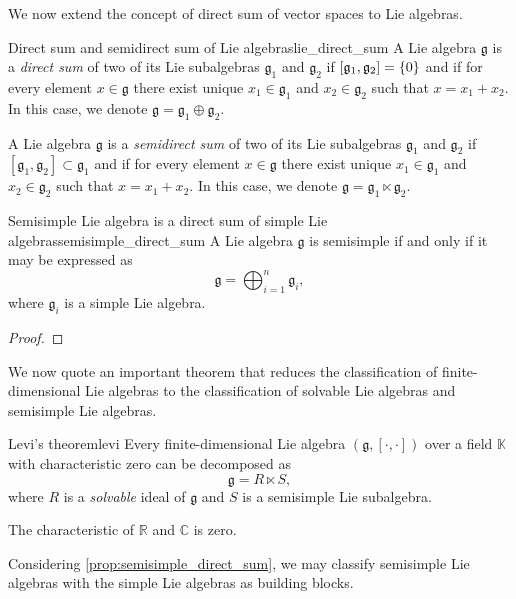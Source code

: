 We now extend the concept of direct sum of vector spaces to Lie algebras.
\begin{definition}{Direct sum and semidirect sum of Lie algebras}{lie_direct_sum}
    A Lie algebra \(\mathfrak{g}\) is a \emph{direct sum} of two of its Lie subalgebras \(\mathfrak{g}_1\) and \(\mathfrak{g}_2\) if \([\mathfrak{g}_1, \mathfrak{g}_2] = \{0\}\) and if for every element \(x \in \mathfrak{g}\) there exist unique \(x_1 \in \mathfrak{g}_1\) and \(x_2 \in \mathfrak{g}_2\) such that \(x = x_1 + x_2.\) In this case, we denote \(\mathfrak{g} = \mathfrak{g}_1 \oplus \mathfrak{g}_2.\)

    A Lie algebra \(\mathfrak{g}\) is a \emph{semidirect sum} of two of its Lie subalgebras \(\mathfrak{g}_1\) and \(\mathfrak{g}_2\) if \([\mathfrak{g}_1, \mathfrak{g}_2] \subset \mathfrak{g}_1\) and if for every element \(x \in \mathfrak{g}\) there exist unique \(x_1 \in \mathfrak{g}_1\) and \(x_2 \in \mathfrak{g}_2\) such that \(x = x_1 + x_2.\) In this case, we denote \(\mathfrak{g} = \mathfrak{g}_1 \ltimes \mathfrak{g}_2\).
\end{definition}
\begin{proposition}{Semisimple Lie algebra is a direct sum of simple Lie algebras}{semisimple_direct_sum}
    A Lie algebra \(\mathfrak{g}\) is semisimple if and only if it may be expressed as
    \begin{equation*}
        \mathfrak{g} = \bigoplus_{i = 1}^{n} \mathfrak{g}_i,
    \end{equation*}
    where \(\mathfrak{g}_i\) is a simple Lie algebra.
\end{proposition}
\begin{proof}
    \todo
\end{proof}

We now quote an important theorem that reduces the classification of finite-dimensional Lie algebras to the classification of solvable Lie algebras and semisimple Lie algebras.
\begin{theorem}{Levi's theorem}{levi}
    Every finite-dimensional Lie algebra \((\mathfrak{g}, [\cdot, \cdot])\) over a field \(\mathbb{K}\) with characteristic zero can be decomposed as
    \begin{equation*}
        \mathfrak{g} = R \ltimes S,
    \end{equation*}
    where \(R\) is a \emph{solvable} ideal of \(\mathfrak{g}\) and \(S\) is a semisimple Lie subalgebra.
\end{theorem}
\begin{remark}
    The characteristic of \(\mathbb{R}\) and \(\mathbb{C}\) is zero.
\end{remark}
Considering \cref{prop:semisimple_direct_sum}, we may classify semisimple Lie algebras with the simple Lie algebras as building blocks.

